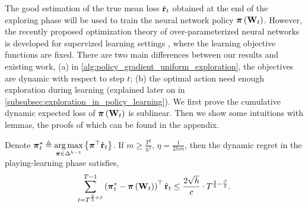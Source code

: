 The good estimation of the true mean loss $\hat{{\mathbf{r}}}_t$ obtained at the end of the exploring phase will be used to train the neural network policy ${\boldsymbol{\pi}}\left( {\mathbf{W}}_t \right)$. However, the recently proposed optimization theory of over-parameterized neural networks is developed for supervized learning settings \citep{li2018learning,allen2018convergenceB}, where the learning objective functions are fixed. There are two main differences between our results and existing work, (a) in \cref{alg:policy_gradient_uniform_exploration}, the objectives are dynamic with respect to step $t$; (b) the optimal action need enough exploration during learning (explained later on in \cref{subsubsec:exploration_in_policy_learning}). We first prove the cumulative dynamic expected loss of ${\boldsymbol{\pi}}\left( {\mathbf{W}}_t \right)$ is sublinear. Then we show some intuitions with lemmas, the proofs of which can be found in the appendix.
\begin{thm}
\label{thm:dynamic_regret_sublinear}
    Denote ${\boldsymbol{\pi}}_t^* \triangleq \operatorname*{arg\,max}\limits_{{\boldsymbol{\pi}} \in \Delta^{h-1}}{\left\{ {\boldsymbol{\pi}}^\top \hat{{\mathbf{r}}}_t\right\}}$. If $m \ge \frac{T^2}{h^2}$, $\eta = \frac{1}{2 h m}$, then the dynamic regret in the playing-learning phase satisfies,
\begin{equation*}
\begin{split}
    \sum\limits_{t=T^{\frac{2}{3}+ \beta}}^{T-1}{ \left(  {{\boldsymbol{\pi}}_t^*} - {\boldsymbol{\pi}}\left( {\mathbf{W}}_t \right) \right)^\top \hat{{\mathbf{r}}}_t } \le \frac{2 \sqrt{h}}{c} \cdot T^{\frac{2}{3} - \frac{\beta}{2}}.
\end{split}
\end{equation*}
\end{thm}
